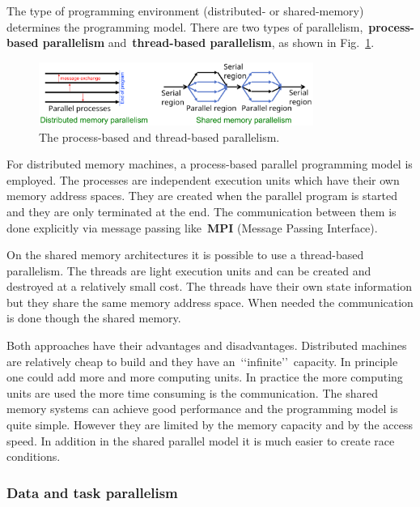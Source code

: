 \par
The type of programming environment (distributed- or shared-memory) determines the programming model.
There are two types of parallelism,~\textbf{process-based parallelism} and~\textbf{thread-based parallelism}, as shown in Fig.~\ref{fig:process_thread_parallelism}.


\begin{figure}[!h]
\centering\includegraphics[width=0.8\textwidth]{fig_hardware/process_thread_parallelism.png}
\caption{The process-based and thread-based parallelism.}\label{fig:process_thread_parallelism}
\end{figure}


\par
For distributed memory machines, a process-based parallel programming model is employed.
The processes are independent execution units which have their own memory address spaces.
They are created when the parallel program is started and they are only terminated at the end.
The communication between them is done explicitly via message passing like~\textbf{MPI} (Message Passing Interface).


\par
On the shared memory architectures it is possible to use a thread-based parallelism.
The threads are light execution units and can be created and destroyed at a relatively small cost.
The threads have their own state information but they share the same memory address space.
When needed the communication is done though the shared memory.


\par
Both approaches have their advantages and disadvantages.
Distributed machines are relatively cheap to build and they have an~\lq\lq infinite\rq\rq~capacity.
In principle one could add more and more computing units.
In practice the more computing units are used the more time consuming is the communication.
The shared memory systems can achieve good performance and the programming model is quite simple.
However they are limited by the memory capacity and by the access speed.
In addition in the shared parallel model it is much easier to create race conditions.


\subsubsection{Data and task parallelism}

